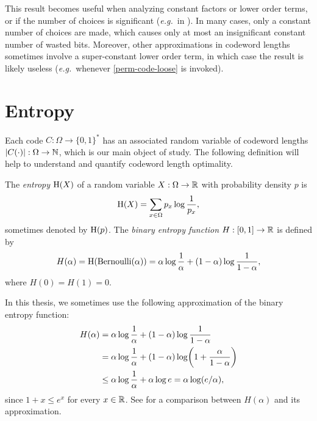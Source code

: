 This result becomes useful when analyzing constant factors or lower
order terms, or if the number of choices is significant
(\emph{e.g.}~in ). In many cases, only a constant
number of choices are made, which causes only at most an insignificant
constant number of wasted bits. Moreover, other approximations in
codeword lengths sometimes involve a super-constant lower order term,
in which case the result is likely useless (\emph{e.g.}~whenever
\eqref{perm-code-loose} is invoked).

\section{Entropy}

Each code $C : \Omega \to \{0, 1\}^*$ has an associated random
variable of codeword lengths $|C(\cdot)| : \Omega \to \mathbb{N}$, which is
our main object of study. The following definition will help to
understand and quantify codeword length optimality.
\begin{defn}
  The \emph{entropy} $\operatorname{\mathrm{H}}(X)$ of a random variable
  $X : \Omega \to \mathbb{R}$ with probability density $p$ is
  \[\operatorname{\mathrm{H}}(X) = \sum_{x \in \Omega} p_x \log \frac{1}{p_x},\]
  sometimes denoted by $\operatorname{\mathrm{H}}(p)$. The \emph{binary entropy function}
  $H : [0, 1] \to \mathbb{R}$ is defined by
  \[H(\alpha) = \operatorname{\mathrm{H}}(\text{Bernoulli}(\alpha)) = \alpha \log
  \frac{1}{\alpha} + (1 - \alpha) \log \frac{1}{1 - \alpha},\]
  where $H(0) = H(1) = 0$.
\end{defn}

In this thesis, we sometimes use the following approximation of the
binary entropy function:
\begin{align}
  H(\alpha) & = \alpha \log \frac{1}{\alpha} + (1 - \alpha) \log \frac{1}{1 - \alpha} \notag \\
  & = \alpha \log \frac{1}{\alpha} + (1 - \alpha) \log \left(1 + \frac{\alpha}{1 - \alpha}\right) \notag \\
  & \leq \alpha \log \frac{1}{\alpha} + \alpha \log e = \alpha \log
  (e/\alpha), \eqlabel{entropy-approx}
\end{align}
since $1 + x \leq e^x$ for every $x \in \mathbb{R}$. See
 for a comparison between $H(\alpha)$ and
its approximation.

